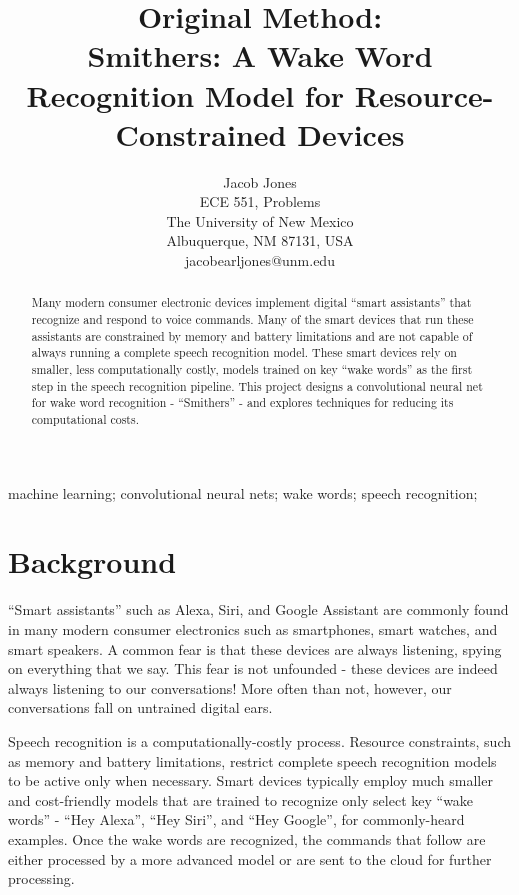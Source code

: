 \documentclass[conference]{IEEEtran}
\begin{document}
\title{Original Method: \\
    Smithers: A Wake Word Recognition Model for Resource-Constrained Devices}
\author{ Jacob Jones \\
    ECE 551, Problems \\
    The University of New Mexico \\
    Albuquerque, NM 87131, USA \\
    jacobearljones@unm.edu}

\maketitle

\begin{abstract}

    Many modern consumer electronic devices implement digital ``smart assistants''
    that recognize and respond to voice commands.
    Many of the smart devices that run these assistants are constrained by memory and battery limitations
    and are not capable of always running a complete speech recognition model.
    These smart devices rely on smaller, less computationally costly,
    models trained on key ``wake words''
    as the first step in the speech recognition pipeline.
    This project designs a convolutional neural net for wake word recognition - ``Smithers'' -
    and explores techniques for reducing its computational costs.

\end{abstract}
\begin{IEEEkeywords}
    machine learning; convolutional neural nets; wake words; speech recognition;
\end{IEEEkeywords}
\IEEEpeerreviewmaketitle

\section{Background}

``Smart assistants'' such as Alexa, Siri, and Google Assistant are commonly found
in many modern consumer electronics such as smartphones, smart watches, and smart speakers.
A common fear is that these devices are always listening, spying on everything that we say.
This fear is not unfounded - these devices are indeed always listening to our conversations!
More often than not, however, our conversations fall on untrained digital ears.

Speech recognition is a computationally-costly process.
Resource constraints, such as memory and battery limitations,
restrict complete speech recognition models to be active only when necessary.
Smart devices typically employ much smaller and cost-friendly models
that are trained to recognize only select key ``wake words'' - 
``Hey Alexa'', ``Hey Siri'', and ``Hey Google'', for commonly-heard examples.
Once the wake words are recognized, the commands that follow
are either processed by a more advanced model
or are sent to the cloud for further processing.
\end{document}
